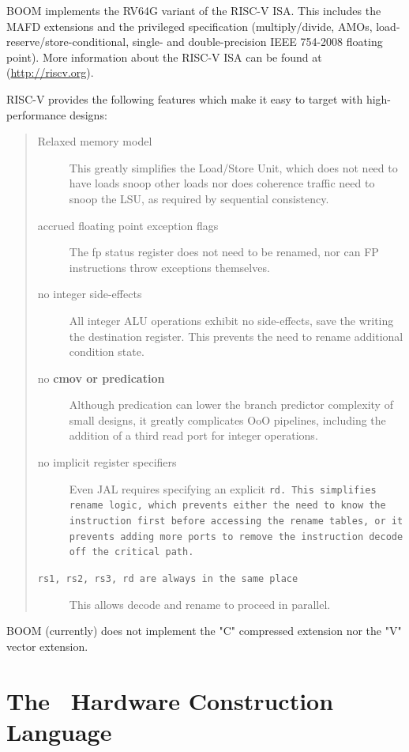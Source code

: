 BOOM implements the RV64G variant of the RISC-V ISA. This includes the MAFD
extensions and the privileged specification (multiply/divide, AMOs,
load-reserve/store-conditional, single- and double-precision IEEE
754-2008 floating point). More information about the RISC-V
ISA can be found at (\url{http://riscv.org}).

RISC-V provides the following features which make it easy to target with high-performance designs:

\begin{quote}
\begin{description}
\item [Relaxed memory model] This greatly simplifies the Load/Store Unit, which does not need to have loads snoop other loads nor does coherence traffic need to snoop the LSU, as required by sequential consistency.
\item [accrued floating point exception flags] The fp status register does not need to be renamed, nor can FP instructions throw exceptions themselves. 
\item [no integer side-effects] All integer ALU operations exhibit no side-effects, save the writing the destination register. This prevents the need to rename additional condition state.
\item [no \bf{cmov} or predication] Although predication can lower the branch predictor complexity of small designs, it greatly complicates OoO pipelines, including the addition of a third read port for integer operations.
\item [no implicit register specifiers] Even JAL requires specifying an explicit \tt{rd}. This simplifies rename logic, which prevents either the need to know the instruction first before accessing the rename tables, or it prevents adding more ports to remove the instruction decode off the critical path.
\item [\tt{rs1}, \tt{rs2}, \tt{rs3}, \tt{rd} are always in the same place] This allows decode and rename to proceed in parallel. 

\end{description}
\end{quote}

BOOM (currently) does not implement the "C" compressed extension nor the "V" vector extension.

\section{The \Chisel\ Hardware Construction Language}

